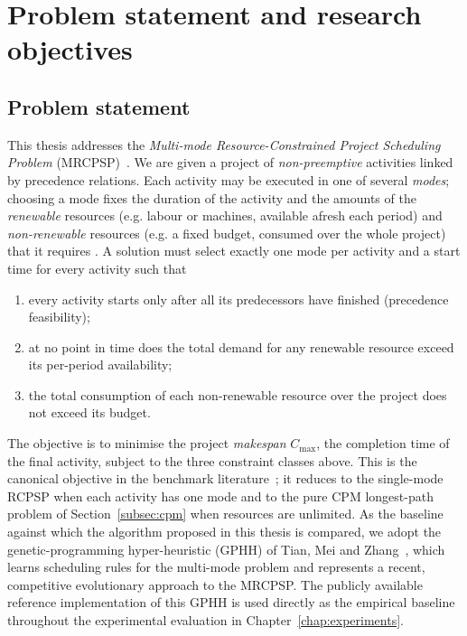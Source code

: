 \section{Problem statement and research objectives}
\label{sec:problem-statement}
\subsection{Problem statement}
\label{subsec:problem-statement}

This thesis addresses the \emph{Multi-mode Resource-Constrained Project
Scheduling Problem} (MRCPSP)~\cite{brucker1999,hartmann2010survey}. We are given
a project of \emph{non-preemptive} activities 
linked by precedence relations. Each activity may be executed in one of several
\emph{modes}; choosing a mode fixes the duration of the activity and the amounts
of the \emph{renewable} resources (e.g. labour or machines, available afresh each
period) and \emph{non-renewable} resources (e.g. a fixed budget, consumed over
the whole project) that it requires \cite{kolischdrexl1994,hartmann2010survey}.
A solution must select exactly one mode per
activity and a start time for every activity such that

\begin{enumerate}
  \item every activity starts only after all its predecessors have finished
        (precedence feasibility);
  \item at no point in time does the total demand for any renewable resource
        exceed its per-period availability;
  \item the total consumption of each non-renewable resource over the project
        does not exceed its budget.
\end{enumerate}

The objective is to minimise the project \emph{makespan} $C_{\max}$, the
completion time of the final activity, subject to the three constraint classes
above. This is the canonical objective in the benchmark
literature~\cite{kolisch1997,demeulemeester2002}; it reduces to the
single-mode RCPSP when each activity has one mode and to the pure CPM
longest-path problem of Section~\ref{subsec:cpm} when resources are unlimited.
As the baseline against which the algorithm proposed in this thesis is compared,
we adopt the genetic-programming hyper-heuristic (GPHH) of
Tian, Mei and Zhang~\cite{Tian2024GPHH}, which learns scheduling rules for the
multi-mode problem and represents a recent, competitive evolutionary approach to
the MRCPSP. The publicly available reference implementation of this GPHH is used
directly as the empirical baseline throughout the experimental evaluation in
Chapter~\ref{chap:experiments}.

